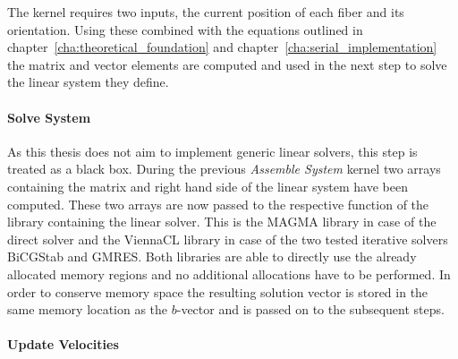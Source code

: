 \documentclass[a4paper,11pt]{kth-mag}
\begin{document}
The kernel requires two inputs, the current position of each fiber and its orientation. Using these combined with the equations outlined in chapter~\ref{cha:theoretical_foundation} and chapter~\ref{cha:serial_implementation} the matrix and vector elements are computed and used in the next step to solve the linear system they define.

\paragraph{Solve System}
As this thesis does not aim to implement generic linear solvers, this step is treated as a black box. During the previous \emph{Assemble System} kernel two arrays containing the matrix and right hand side of the linear system have been computed. These two arrays are now passed to the respective function of the library containing the linear solver. This is the MAGMA library in case of the direct solver and the ViennaCL library in case of the two tested iterative solvers BiCGStab and GMRES. Both libraries are able to directly use the already allocated memory regions and no additional allocations have to be performed. In order to conserve memory space the resulting solution vector is stored in the same memory location as the $b$-vector and is passed on to the subsequent steps.

\paragraph{Update Velocities}
\end{document}
